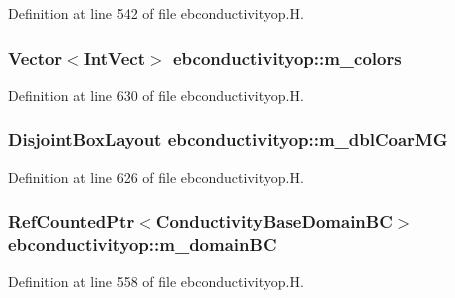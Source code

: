 Definition at line 542 of file ebconductivityop.\+H.

\subsubsection[{\texorpdfstring{m\+\_\+colors}{m_colors}}]{\setlength{\rightskip}{0pt plus 5cm}Vector$<$Int\+Vect$>$ ebconductivityop\+::m\+\_\+colors\hspace{0.3cm}{\ttfamily [protected]}}\hypertarget{classebconductivityop_a563b09a50a5293e55ece178315da3bbe}{}\label{classebconductivityop_a563b09a50a5293e55ece178315da3bbe}


Definition at line 630 of file ebconductivityop.\+H.

\subsubsection[{\texorpdfstring{m\+\_\+dbl\+Coar\+MG}{m_dblCoarMG}}]{\setlength{\rightskip}{0pt plus 5cm}Disjoint\+Box\+Layout ebconductivityop\+::m\+\_\+dbl\+Coar\+MG\hspace{0.3cm}{\ttfamily [protected]}}\hypertarget{classebconductivityop_ad68e0a1bebe988eee7f6742beaf60839}{}\label{classebconductivityop_ad68e0a1bebe988eee7f6742beaf60839}


Definition at line 626 of file ebconductivityop.\+H.

\subsubsection[{\texorpdfstring{m\+\_\+domain\+BC}{m_domainBC}}]{\setlength{\rightskip}{0pt plus 5cm}Ref\+Counted\+Ptr$<$Conductivity\+Base\+Domain\+BC$>$ ebconductivityop\+::m\+\_\+domain\+BC\hspace{0.3cm}{\ttfamily [protected]}}\hypertarget{classebconductivityop_a421aabc47547b41d3261de13ac5d5663}{}\label{classebconductivityop_a421aabc47547b41d3261de13ac5d5663}


Definition at line 558 of file ebconductivityop.\+H.

